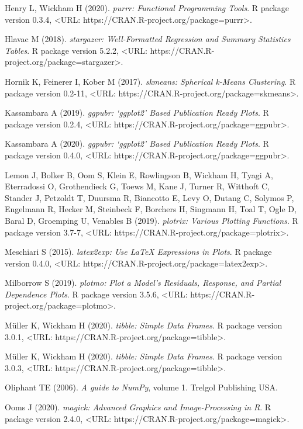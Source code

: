 \documentclass{puthesis}
\begin{document}
Henry L, Wickham H (2020). \emph{purrr: Functional Programming Tools}. R
package version 0.3.4, \textless URL:
https://CRAN.R-project.org/package=purrr\textgreater.

Hlavac M (2018). \emph{stargazer: Well-Formatted Regression and Summary
Statistics Tables}. R package version 5.2.2, \textless URL:
https://CRAN.R-project.org/package=stargazer\textgreater.

Hornik K, Feinerer I, Kober M (2017). \emph{skmeans: Spherical k-Means
Clustering}. R package version 0.2-11, \textless URL:
https://CRAN.R-project.org/package=skmeans\textgreater.

Kassambara A (2019). \emph{ggpubr: `ggplot2' Based Publication Ready
Plots}. R package version 0.2.4, \textless URL:
https://CRAN.R-project.org/package=ggpubr\textgreater.

Kassambara A (2020). \emph{ggpubr: `ggplot2' Based Publication Ready
Plots}. R package version 0.4.0, \textless URL:
https://CRAN.R-project.org/package=ggpubr\textgreater.

Lemon J, Bolker B, Oom S, Klein E, Rowlingson B, Wickham H, Tyagi A,
Eterradossi O, Grothendieck G, Toews M, Kane J, Turner R, Witthoft C,
Stander J, Petzoldt T, Duursma R, Biancotto E, Levy O, Dutang C, Solymos
P, Engelmann R, Hecker M, Steinbeck F, Borchers H, Singmann H, Toal T,
Ogle D, Baral D, Groemping U, Venables B (2019). \emph{plotrix: Various
Plotting Functions}. R package version 3.7-7, \textless URL:
https://CRAN.R-project.org/package=plotrix\textgreater.

Meschiari S (2015). \emph{latex2exp: Use LaTeX Expressions in Plots}. R
package version 0.4.0, \textless URL:
https://CRAN.R-project.org/package=latex2exp\textgreater.

Milborrow S (2019). \emph{plotmo: Plot a Model's Residuals, Response,
and Partial Dependence Plots}. R package version 3.5.6, \textless URL:
https://CRAN.R-project.org/package=plotmo\textgreater.

Müller K, Wickham H (2020). \emph{tibble: Simple Data Frames}. R package
version 3.0.1, \textless URL:
https://CRAN.R-project.org/package=tibble\textgreater.

Müller K, Wickham H (2020). \emph{tibble: Simple Data Frames}. R package
version 3.0.3, \textless URL:
https://CRAN.R-project.org/package=tibble\textgreater.

Oliphant TE (2006). \emph{A guide to NumPy}, volume 1. Trelgol
Publishing USA.

Ooms J (2020). \emph{magick: Advanced Graphics and Image-Processing in
R}. R package version 2.4.0, \textless URL:
https://CRAN.R-project.org/package=magick\textgreater.
\end{document}
